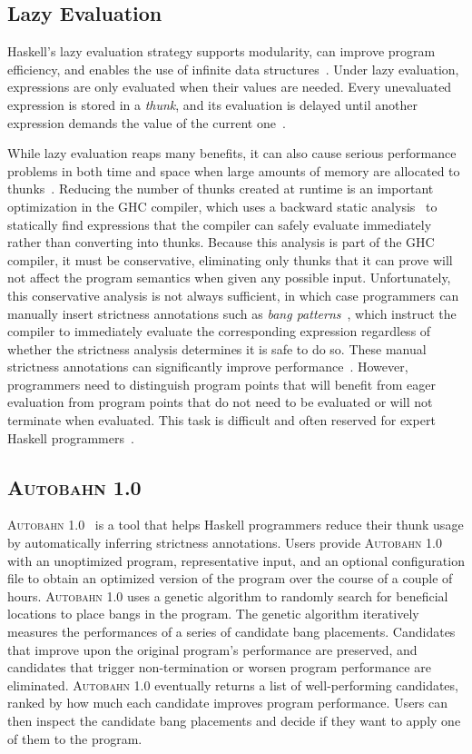 \documentclass[format=sigplan, review=true, 9pt]{acmart}
\newcommand{\Ao}[0]{\textsc{Autobahn 1.0}}
\begin{document}
\subsection{Lazy Evaluation}
Haskell's lazy evaluation strategy supports modularity, can improve
program efficiency, and enables the use of infinite data
structures~\cite{Hughes89}. Under lazy evaluation, expressions are
only evaluated when their values are needed. Every unevaluated
expression is stored in a \textit{thunk}, and its evaluation is
delayed until another expression demands the value of the current
one~\cite{PeytonJones89}. 

While lazy evaluation reaps many benefits, it can also cause serious
performance problems in both time and space when large amounts of
memory are allocated to thunks~\cite{Jones94,Santos98,Ennals03}.
Reducing the number of thunks created at runtime is an important
optimization in the GHC compiler, which uses a backward static
analysis~\cite{Sergey14} to statically find expressions that the
compiler can safely evaluate immediately rather than converting into
thunks.  Because this analysis is part of the GHC compiler, it must be
conservative, eliminating only thunks that it can prove will not
affect the program semantics when given any possible input.
Unfortunately, this conservative analysis is not always sufficient, in
which case programmers can manually insert strictness annotations such
as \textit{bang patterns}~\cite{bang}, which instruct the compiler to
immediately evaluate the corresponding expression regardless of
whether the strictness analysis determines it is safe to do so.  These
manual strictness annotations can significantly improve
performance~\cite[Chapter~25]{rwh}. However, programmers need to
distinguish program points that will benefit from eager evaluation
from program points that do not need to be evaluated or will not
terminate when evaluated. This task is difficult and often reserved
for expert Haskell programmers~\cite{Mitchell13}.

\subsection{\Ao}

\Ao~\cite{autobahn-wang} is a tool that helps Haskell programmers 
reduce their thunk usage by automatically inferring strictness
annotations. Users provide \Ao{} with an unoptimized
program, representative input, and an optional configuration file to
obtain an optimized version of the program over the course of a couple
of hours.
\Ao{} uses a genetic algorithm to randomly search for
beneficial locations to place bangs in the program. The genetic
algorithm iteratively measures the performances of a series of
candidate bang placements. Candidates that improve upon the original
program's performance are preserved, and candidates that trigger
non-termination or worsen program performance are
eliminated. \Ao{} eventually returns a list
of well-performing candidates, ranked by how much each candidate
improves program performance. Users can then inspect the candidate
bang placements and decide if they want to apply one of them to the
program.
\end{document}
